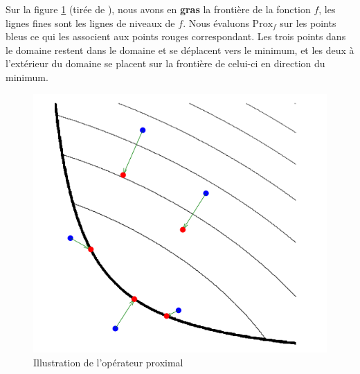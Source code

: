 \documentclass[a4paper,12pt]{article}
\newcommand{\prox}{\text{Prox}}
\begin{document}
Sur la figure \ref{fig:proximal} (tirée de \cite{parikh2014proximal}), nous avons en \textbf{gras} la frontière de la fonction $f$, les lignes fines sont les lignes de niveaux de $f$. Nous évaluons $\prox_f$ sur les points bleus ce qui les associent aux points rouges correspondant. Les trois points dans le domaine restent dans le domaine et se déplacent vers le minimum, et les deux à l'extérieur du domaine se placent sur la frontière de celui-ci en direction du minimum. 
\begin{figure}[!h]
\centering
\includegraphics[scale=0.7]{img/proximal.png}
\caption{\label{fig:proximal}Illustration de l'opérateur proximal}
\end{figure}\\
\end{document}
